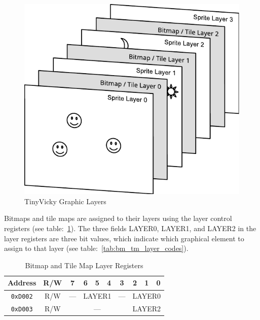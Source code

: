 \begin{figure}[ht]
    \begin{center}
        \includegraphics{images/Layers.pdf}
    \end{center}
    \caption{TinyVicky Graphic Layers}
    \label{fig:layers}
\end{figure}

Bitmaps and tile maps are assigned to their layers using the layer control registers (see table:~\ref{tab:bm_tm_layers}). The three fields LAYER0, LAYER1, and LAYER2 in the layer registers are three bit values, which indicate which graphical element to assign to that layer (see table:~\ref{tab:bm_tm_layer_codes}).

\begin{table}[ht]
    \begin{center}
        \begin{tabular}{|c|c|c|c|c|c|c|c|c|c|} \hline
            Address & R/W & 7 & 6 & 5 & 4 & 3 & 2 & 1 & 0 \\ \hline\hline
            \verb+0xD002+ & R/W & --- & \multicolumn{3}{|c|}{LAYER1} & --- & \multicolumn{3}{|c|}{LAYER0} \\\hline
            \verb+0xD003+ & R/W & \multicolumn{5}{|c|}{---} & \multicolumn{3}{|c|}{LAYER2} \\\hline
        \end{tabular}
    \end{center}
    \caption{Bitmap and Tile Map Layer Registers}
    \label{tab:bm_tm_layers}
\end{table}

